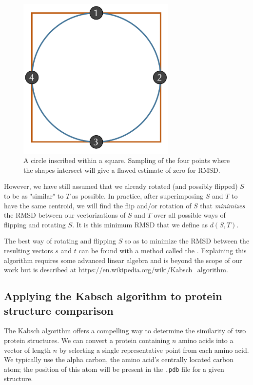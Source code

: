 {{\begin{figure}[h]
	\centering
	\mySfFamily
	\includegraphics[width = 0.7\textwidth]{../images/circle_square_undersampling.png}
	\caption{A circle inscribed within a square. Sampling of the four points where the shapes intersect will give a flawed estimate of zero for RMSD.}
	\label{fig:circle_square_undersampling}
\end{figure}

However, we have still assumed that we already rotated (and possibly flipped) $S$ to be as "similar" to $T$ as possible. In practice, after superimposing $S$ and $T$ to have the same centroid, we will find the flip and/or rotation of $S$ that \textit{minimizes} the RMSD between our vectorizations of $S$ and $T$ over all possible ways of flipping and rotating $S$. It is this minimum RMSD that we define as $d(S, T)$.

The best way of rotating and flipping $S$ so as to minimize the RMSD between the resulting vectors $s$ and $t$ can be found with a method called the . Explaining this algorithm requires some advanced linear algebra and is beyond the scope of our work but is described at \url{https://en.wikipedia.org/wiki/Kabsch_algorithm}.

\FloatBarrier
{}
\subsection{Applying the Kabsch algorithm to protein structure comparison}

The Kabsch algorithm offers a compelling way to determine the similarity of two protein structures. We can convert a protein containing $n$ amino acids into a vector of length $n$ by selecting a single representative point from each amino acid. We typically use the alpha carbon, the amino acid's centrally located carbon atom; the position of this atom will be present in the \texttt{.pdb} file for a given structure.

}}
